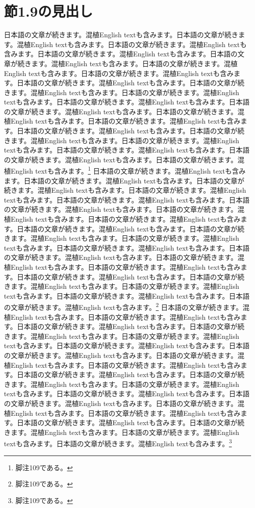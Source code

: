 \documentclass[pdflatex,book]{jlreq}
\begin{document}
\section{節1.9の見出し}
日本語の文章が続きます。混植English textも含みます。日本語の文章が続きます。混植English textも含みます。日本語の文章が続きます。混植English textも含みます。日本語の文章が続きます。混植English textも含みます。日本語の文章が続きます。混植English textも含みます。日本語の文章が続きます。混植English textも含みます。日本語の文章が続きます。混植English textも含みます。日本語の文章が続きます。混植English textも含みます。日本語の文章が続きます。混植English textも含みます。日本語の文章が続きます。混植English textも含みます。日本語の文章が続きます。混植English textも含みます。日本語の文章が続きます。混植English textも含みます。日本語の文章が続きます。混植English textも含みます。日本語の文章が続きます。混植English textも含みます。日本語の文章が続きます。混植English textも含みます。日本語の文章が続きます。混植English textも含みます。日本語の文章が続きます。混植English textも含みます。日本語の文章が続きます。混植English textも含みます。日本語の文章が続きます。混植English textも含みます。日本語の文章が続きます。混植English textも含みます。\footnote{脚注109である。}
日本語の文章が続きます。混植English textも含みます。日本語の文章が続きます。混植English textも含みます。日本語の文章が続きます。混植English textも含みます。日本語の文章が続きます。混植English textも含みます。日本語の文章が続きます。混植English textも含みます。日本語の文章が続きます。混植English textも含みます。日本語の文章が続きます。混植English textも含みます。日本語の文章が続きます。混植English textも含みます。日本語の文章が続きます。混植English textも含みます。日本語の文章が続きます。混植English textも含みます。日本語の文章が続きます。混植English textも含みます。日本語の文章が続きます。混植English textも含みます。日本語の文章が続きます。混植English textも含みます。日本語の文章が続きます。混植English textも含みます。日本語の文章が続きます。混植English textも含みます。日本語の文章が続きます。混植English textも含みます。日本語の文章が続きます。混植English textも含みます。日本語の文章が続きます。混植English textも含みます。日本語の文章が続きます。混植English textも含みます。日本語の文章が続きます。混植English textも含みます。\footnote{脚注109である。}
日本語の文章が続きます。混植English textも含みます。日本語の文章が続きます。混植English textも含みます。日本語の文章が続きます。混植English textも含みます。日本語の文章が続きます。混植English textも含みます。日本語の文章が続きます。混植English textも含みます。日本語の文章が続きます。混植English textも含みます。日本語の文章が続きます。混植English textも含みます。日本語の文章が続きます。混植English textも含みます。日本語の文章が続きます。混植English textも含みます。日本語の文章が続きます。混植English textも含みます。日本語の文章が続きます。混植English textも含みます。日本語の文章が続きます。混植English textも含みます。日本語の文章が続きます。混植English textも含みます。日本語の文章が続きます。混植English textも含みます。日本語の文章が続きます。混植English textも含みます。日本語の文章が続きます。混植English textも含みます。日本語の文章が続きます。混植English textも含みます。日本語の文章が続きます。混植English textも含みます。日本語の文章が続きます。混植English textも含みます。日本語の文章が続きます。混植English textも含みます。\footnote{脚注109である。}
\end{document}
